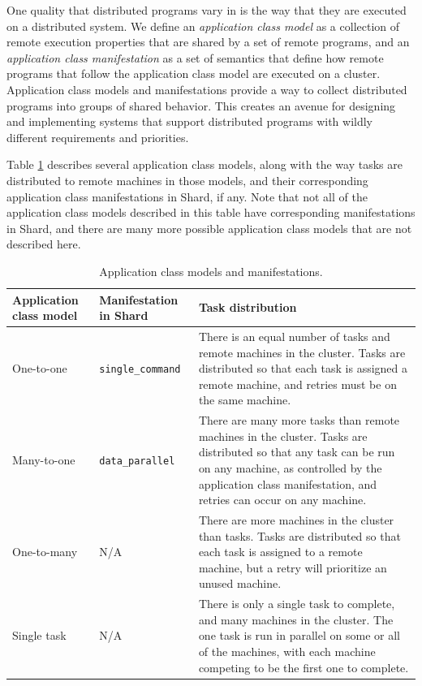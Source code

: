 \documentclass[twoside]{report}
\begin{document}
One quality that distributed programs vary in is the way that they are executed on a distributed system.
We define an \textit{application class model} as a collection of remote execution properties that are shared by a set of remote programs, and an \textit{application class manifestation} as a set of semantics that define how remote programs that follow the application class model are executed on a cluster.
Application class models and manifestations provide a way to collect distributed programs into groups of shared behavior.
This creates an avenue for designing and implementing systems that support distributed programs with wildly different requirements and priorities.

Table \ref{fig:application_class_models} describes several application class models, along with the way tasks are distributed to remote machines in those models, and their corresponding application class manifestations in Shard, if any.
Note that not all of the application class models described in this table have corresponding manifestations in Shard, and there are many more possible application class models that are not described here.

\begin{table}[h]
  \begin{center}
    \begin{tabularx}{\textwidth}{|l|l|X|}
      \hline
      Application class model & Manifestation in Shard   & Task distribution
      \\ \hline
      One-to-one              & \texttt{single\_command} & There is an equal number of tasks and remote machines in the cluster. Tasks are distributed so that each task is assigned a remote machine, and retries must be on the same machine.
      \\ \hline
      Many-to-one             & \texttt{data\_parallel}  & There are many more tasks than remote machines in the cluster. Tasks are distributed so that any task can be run on any machine, as controlled by the application class manifestation, and retries can occur on any machine.
      \\ \hline
      One-to-many             & N/A                      & There are more machines in the cluster than tasks.
      Tasks are distributed so that each task is assigned to a remote machine, but a retry will prioritize an unused machine.
      \\ \hline
      Single task             & N/A                      & There is only a single task to complete, and many machines in the cluster. The one task is run in parallel on some or all of the machines, with each machine competing to be the first one to complete.
      \\ \hline
    \end{tabularx}
    \caption{Application class models and manifestations.}
    \label{fig:application_class_models}
  \end{center}
\end{table}
\end{document}

